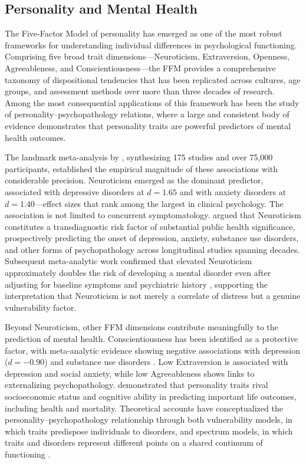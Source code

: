 \documentclass[12pt, a4paper]{article}
\begin{document}
\subsection{Personality and Mental Health}

The Five-Factor Model of personality \citep[FFM;][]{mccrae1992introduction, goldberg1993structure} has emerged as one of the most robust frameworks for understanding individual differences in psychological functioning. Comprising five broad trait dimensions---Neuroticism, Extraversion, Openness, Agreeableness, and Conscientiousness---the FFM provides a comprehensive taxonomy of dispositional tendencies that has been replicated across cultures, age groups, and assessment methods over more than three decades of research. Among the most consequential applications of this framework has been the study of personality--psychopathology relations, where a large and consistent body of evidence demonstrates that personality traits are powerful predictors of mental health outcomes.

The landmark meta-analysis by \citet{kotov2010linking}, synthesizing 175 studies and over 75,000 participants, established the empirical magnitude of these associations with considerable precision. Neuroticism emerged as the dominant predictor, associated with depressive disorders at $d = 1.65$ and with anxiety disorders at $d = 1.40$---effect sizes that rank among the largest in clinical psychology. The association is not limited to concurrent symptomatology. \citet{lahey2009public} argued that Neuroticism constitutes a transdiagnostic risk factor of substantial public health significance, prospectively predicting the onset of depression, anxiety, substance use disorders, and other forms of psychopathology across longitudinal studies spanning decades. Subsequent meta-analytic work confirmed that elevated Neuroticism approximately doubles the risk of developing a mental disorder even after adjusting for baseline symptoms and psychiatric history \citep{dewall2011agree}, supporting the interpretation that Neuroticism is not merely a correlate of distress but a genuine vulnerability factor.

Beyond Neuroticism, other FFM dimensions contribute meaningfully to the prediction of mental health. Conscientiousness has been identified as a protective factor, with meta-analytic evidence showing negative associations with depression ($d = -0.90$) and substance use disorders \citep{kotov2010linking}. Low Extraversion is associated with depression and social anxiety, while low Agreeableness shows links to externalizing psychopathology. \citet{roberts2007power} demonstrated that personality traits rival socioeconomic status and cognitive ability in predicting important life outcomes, including health and mortality. Theoretical accounts have conceptualized the personality--psychopathology relationship through both vulnerability models, in which traits predispose individuals to disorders, and spectrum models, in which traits and disorders represent different points on a shared continuum of functioning \citep{widiger2007plate}.
\end{document}

